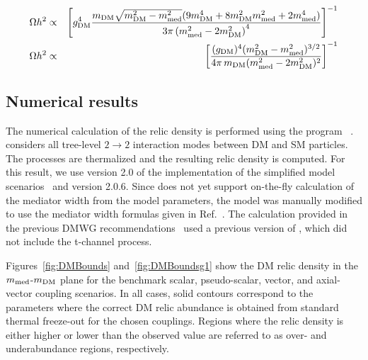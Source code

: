 
\begin{eqnarray}
\label{eq:TS} \Omega h^2 & \propto & \left[g_{\rm DM}^4\frac{m_{\rm DM}\sqrt{m_{\rm DM}^2-m_{\rm med}^2}( 9m_{\rm DM}^4+8m_{\rm DM}^2m_{\rm med}^2+2m_{\rm med}^4)}{3\pi\left(m_{\rm med}^2-2m_{\rm DM}^2\right)^4} \right]^{-1} \\  
\label{eq:TV} \Omega h^2 & \propto & \left[\frac{ (g_{\rm DM})^4 (m_{\rm DM}^2 - m_{\rm med}^2)^{3/2}}{4 \pi \, m_{\rm DM}(m_{\rm med}^2 - 2 m_{\rm DM}^2)^2}  \right]^{-1}     
\end{eqnarray}


\subsection{Numerical results}

The numerical calculation of the relic density is performed using the program \maddm~\cite{Backovic:2013dpa,Backovic:2015tpt}. \maddm considers all tree-level $2\rightarrow2$ interaction modes between DM and SM particles. The processes are thermalized and the resulting relic density is computed.
For this result, we use version 2.0 of the \dmsimp implementation of the simplified model scenarios~\cite{Backovic:2015soa,Neubert:2015fka,Mattelaer:2015haa} and \maddm version 2.0.6.
Since \maddm does not yet support on-the-fly calculation of the mediator width from the model parameters, the \dmsimp model was manually modified to use the mediator width formulas given in Ref.~\cite{Boveia:2016mrp}. The calculation provided in the previous DMWG recommendations~\cite{Pree:2016hwc} used a previous version of \maddm, which did not include the t-channel process. 


Figures~\ref{fig:DMBounds} and~\ref{fig:DMBoundsg1} show the DM relic density in the $m_{\rm med}$-$m_{\rm DM}$ plane for the benchmark scalar, pseudo-scalar, vector, and axial-vector coupling scenarios. In all cases, solid contours correspond to the parameters where the correct DM relic abundance is obtained from standard thermal freeze-out for the chosen couplings. Regions where the relic density is either higher or lower than the observed value are referred to as over- and underabundance regions, respectively.

